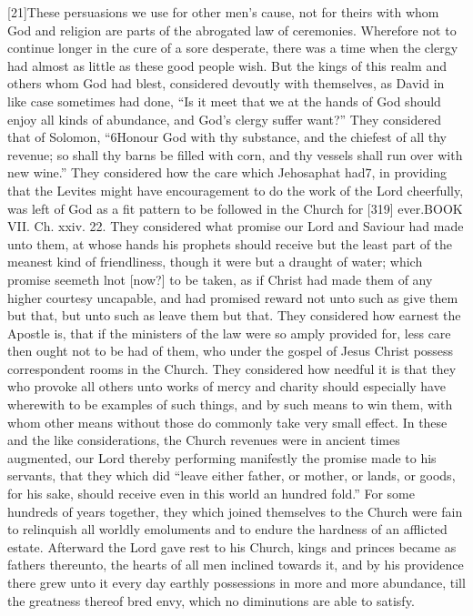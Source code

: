[21]These persuasions we use for other men’s cause, not for theirs with whom God and religion are parts of the abrogated law of ceremonies. Wherefore not to continue longer in the cure of a sore desperate, there was a time when the clergy had almost as little as these good people wish. But the kings of this realm and others whom God had blest, considered devoutly with themselves, as David in like case sometimes had done, “Is it meet that we at the hands of God should enjoy all kinds of abundance, and God’s clergy suffer want?” They considered that of Solomon, “6Honour God with thy substance, and the chiefest of all thy revenue; so shall thy barns be filled with corn, and thy vessels shall run over with new wine.” They considered how the care which Jehosaphat had7, in providing that the Levites might have encouragement to do the work of the Lord cheerfully, was left of God as a fit pattern to be followed in the Church for [319] ever.BOOK VII. Ch. xxiv. 22. They considered what promise our Lord and Saviour had made unto them, at whose hands his prophets should receive but the least part of the meanest kind of friendliness, though it were but a draught of water; which promise seemeth lnot [now?] to be taken, as if Christ had made them of any higher courtesy uncapable, and had promised reward not unto such as give them but that, but unto such as leave them but that. They considered how earnest the Apostle is, that if the ministers of the law were so amply provided for, less care then ought not to be had of them, who under the gospel of Jesus Christ possess correspondent rooms in the Church. They considered how needful it is that they who provoke all others unto works of mercy and charity should especially have wherewith to be examples of such things, and by such means to win them, with whom other means without those do commonly take very small effect. In these and the like considerations, the Church revenues were in ancient times augmented, our Lord thereby performing manifestly the promise made to his servants, that they which did “leave either father, or mother, or lands, or goods, for his sake, should receive even in this world an hundred fold.” For some hundreds of years together, they which joined themselves to the Church were fain to relinquish all worldly emoluments and to endure the hardness of an afflicted estate. Afterward the Lord gave rest to his Church, kings and princes became as fathers thereunto, the hearts of all men inclined towards it, and by his providence there grew unto it every day earthly possessions in more and more abundance, till the greatness thereof bred envy, which no diminutions are able to satisfy.

